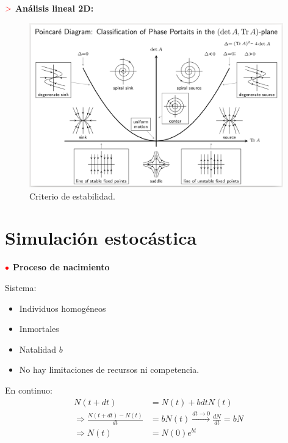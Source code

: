 \documentclass[%
 reprint,
 amsmath,amssymb,
 aps,
]{revtex4-1}
\newcommand{\propiedad}{\textcolor{red}{\mathbf{>}}}
\newcommand{\tema}{\color{red}{\bullet}}
\begin{document}
$\propiedad$ \textbf{Análisis lineal 2D:}
\begin{figure}[ht!]
  \includegraphics[width = 0.98\textwidth]{Stability_Diagram.png}
  \caption{\label{fig:figura1} Criterio de estabilidad.}
\end{figure} 

\section{Simulación estocástica}

$\tema$ \textbf{Proceso de nacimiento}

Sistema:
\begin{itemize}
  \item Individuos homogéneos
  \item Inmortales
  \item Natalidad $b$
  \item No hay limitaciones de recursos ni competencia. 
\end{itemize}

En continuo:
$$
\begin{aligned}
  N(t+d t) &= N(t)+b d t N(t) \\
  \Rightarrow \frac{N(t+d t)-N(t)}{d t} &= b N(t) \stackrel{d t \rightarrow 0}{\longrightarrow} \frac{d N}{d t}=b N \\
  \Rightarrow N(t) &= N(0) e^{b t}
\end{aligned}
$$

\end{document}
